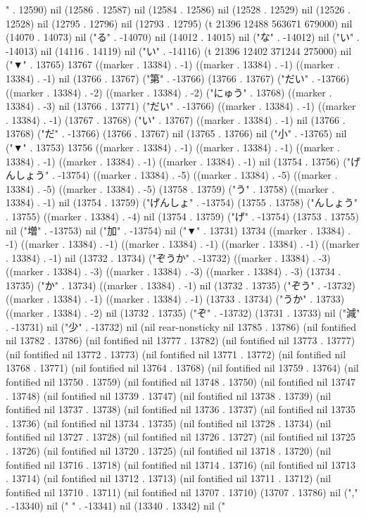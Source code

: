 " . 12590) nil (12586 . 12587) nil (12584 . 12586) nil (12528 . 12529) nil (12526 . 12528) nil (12795 . 12796) nil (12793 . 12795) (t 21396 12488 563671 679000) nil (14070 . 14073) nil ("る" . -14070) nil (14012 . 14015) nil ("な" . -14012) nil ("い" . -14013) nil (14116 . 14119) nil ("い" . -14116) (t 21396 12402 371244 275000) nil ("▼" . 13765) 13767 ((marker . 13384) . -1) ((marker . 13384) . -1) ((marker . 13384) . -1) nil (13766 . 13767) ("第" . -13766) (13766 . 13767) ("だい" . -13766) ((marker . 13384) . -2) ((marker . 13384) . -2) ("にゅう" . 13768) ((marker . 13384) . -3) nil (13766 . 13771) ("だい" . -13766) ((marker . 13384) . -1) ((marker . 13384) . -1) (13767 . 13768) ("い" . 13767) ((marker . 13384) . -1) nil (13766 . 13768) ("だ" . -13766) (13766 . 13767) nil (13765 . 13766) nil ("小" . -13765) nil ("▼" . 13753) 13756 ((marker . 13384) . -1) ((marker . 13384) . -1) ((marker . 13384) . -1) ((marker . 13384) . -1) ((marker . 13384) . -1) nil (13754 . 13756) ("げんしょう" . -13754) ((marker . 13384) . -5) ((marker . 13384) . -5) ((marker . 13384) . -5) ((marker . 13384) . -5) (13758 . 13759) ("う" . 13758) ((marker . 13384) . -1) nil (13754 . 13759) ("げんしょ" . -13754) (13755 . 13758) ("んしょう" . 13755) ((marker . 13384) . -4) nil (13754 . 13759) ("げ" . -13754) (13753 . 13755) nil ("増" . -13753) nil ("加" . -13754) nil ("▼" . 13731) 13734 ((marker . 13384) . -1) ((marker . 13384) . -1) ((marker . 13384) . -1) ((marker . 13384) . -1) ((marker . 13384) . -1) nil (13732 . 13734) ("ぞうか" . -13732) ((marker . 13384) . -3) ((marker . 13384) . -3) ((marker . 13384) . -3) ((marker . 13384) . -3) (13734 . 13735) ("か" . 13734) ((marker . 13384) . -1) nil (13732 . 13735) ("ぞう" . -13732) ((marker . 13384) . -1) ((marker . 13384) . -1) (13733 . 13734) ("うか" . 13733) ((marker . 13384) . -2) nil (13732 . 13735) ("ぞ" . -13732) (13731 . 13733) nil ("減" . -13731) nil ("少" . -13732) nil (nil rear-nonsticky nil 13785 . 13786) (nil fontified nil 13782 . 13786) (nil fontified nil 13777 . 13782) (nil fontified nil 13773 . 13777) (nil fontified nil 13772 . 13773) (nil fontified nil 13771 . 13772) (nil fontified nil 13768 . 13771) (nil fontified nil 13764 . 13768) (nil fontified nil 13759 . 13764) (nil fontified nil 13750 . 13759) (nil fontified nil 13748 . 13750) (nil fontified nil 13747 . 13748) (nil fontified nil 13739 . 13747) (nil fontified nil 13738 . 13739) (nil fontified nil 13737 . 13738) (nil fontified nil 13736 . 13737) (nil fontified nil 13735 . 13736) (nil fontified nil 13734 . 13735) (nil fontified nil 13728 . 13734) (nil fontified nil 13727 . 13728) (nil fontified nil 13726 . 13727) (nil fontified nil 13725 . 13726) (nil fontified nil 13720 . 13725) (nil fontified nil 13718 . 13720) (nil fontified nil 13716 . 13718) (nil fontified nil 13714 . 13716) (nil fontified nil 13713 . 13714) (nil fontified nil 13712 . 13713) (nil fontified nil 13711 . 13712) (nil fontified nil 13710 . 13711) (nil fontified nil 13707 . 13710) (13707 . 13786) nil ("," . -13340) nil (" " . -13341) nil (13340 . 13342) nil ("
